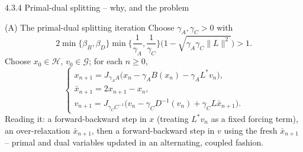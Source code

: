 \documentclass[aspectratio=169,10pt]{beamer}
\begin{document}
\begin{frame}[allowframebreaks]{4.3.4 Primal-dual splitting -- why, and the problem}
  \begin{block}{(A) The primal-dual splitting iteration}
    Choose $\gamma_A,\gamma_C>0$ with
    \begin{equation*}
      2\min\{\beta_B,\beta_D\}\min\Big\{\frac1{\gamma_A},\frac1{\gamma_C}\Big\}\Big(1-\sqrt{\gamma_A\gamma_C\|L\|^2}\Big) > 1. \tag{4.18}
    \end{equation*}
    Choose $x_0\in\mathcal H$, $v_0\in\mathcal G$; for each $n\ge0$,
    \begin{equation*}
      \begin{cases}
        x_{n+1} = J_{\gamma_A A}\big(x_n-\gamma_A B(x_n)-\gamma_A L^*v_n\big), \\
        \bar x_{n+1} = 2x_{n+1}-x_n, \\
        v_{n+1} = J_{\gamma_C C^{-1}}\big(v_n-\gamma_C D^{-1}(v_n)+\gamma_C L\bar x_{n+1}\big).
      \end{cases} \tag{4.19}
    \end{equation*}
    Reading it: a forward-backward step in $x$ (treating $L^*v_n$ as a fixed forcing term), an over-relaxation $\bar x_{n+1}$, then a forward-backward step in $v$ using the fresh $\bar x_{n+1}$ -- primal and dual variables updated in an alternating, coupled fashion.
  \end{block}

  \framebreak


\end{frame}
\end{document}

